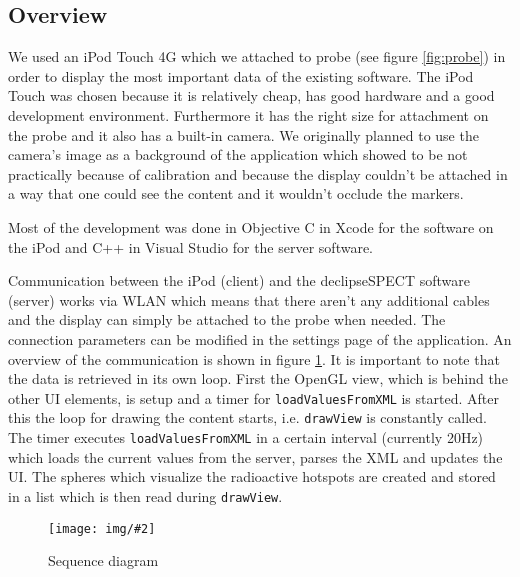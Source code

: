 \documentclass{scrartcl}
\newcommand{\red}[1]{{\color{red} #1}}
\newcommand{\graphic}[3][width=\linewidth] %
{
  \begin{figure}[h!t]
    \centering
    \texttt{[image: img/\#2]}
    \caption{#3}
    \label{fig:#2}
  \end{figure}
}
\newcommand{\refFigure}[1]{figure \ref{fig:#1}}
\begin{document}
\subsection{Overview}
We used an iPod Touch 4G which we attached to probe (see \refFigure{probe}) in order to display the most important data of the existing software.
The iPod Touch was chosen because it is relatively cheap, has good hardware and a good development environment. Furthermore it has the right size for attachment on the probe and it also has a built-in camera. We originally planned to use the camera's image as a background of the application which showed to be not practically because of calibration and because the display couldn't be attached in a way that one could see the content and it wouldn't occlude the markers.

Most of the development was done in Objective C in Xcode for the software on the iPod and C++ in Visual Studio for the server software.

Communication between the iPod (client) and the declipseSPECT software (server) works via WLAN which means that there aren't any additional cables and the display can simply be attached to the probe when needed. The connection parameters can be modified in the settings page of the application.
An overview of the communication is shown in \refFigure{sequence-diagram}. It is important to note that the data is retrieved in its own loop. First the OpenGL view, which is behind the other UI elements, is setup and a timer for \verb|loadValuesFromXML| is started. After this the loop for drawing the content starts, i.e. \verb|drawView| is constantly called. The timer executes \verb|loadValuesFromXML| in a certain interval (currently 20Hz) which loads the current values from the server, parses the XML and updates the UI. The spheres which visualize the radioactive hotspots are created and stored in a list which is then read during \verb|drawView|.
\graphic[scale=.8]{sequence-diagram}{Sequence diagram}
\end{document}
